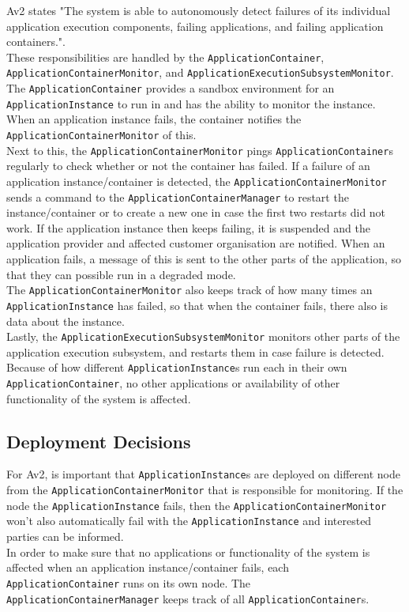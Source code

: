         Av2 states "The system is able to autonomously detect failures of its individual
        application execution components, failing applications, and failing application containers.".\\
        These responsibilities are handled by the \texttt{ApplicationContainer}, \texttt{ApplicationContainerMonitor}, and \texttt{ApplicationExecutionSubsystemMonitor}.
        The \texttt{ApplicationContainer} provides a sandbox environment for an \texttt{ApplicationInstance} to run in and has the ability
        to monitor the instance. When an application instance fails, the container notifies the \texttt{ApplicationContainerMonitor} of this.\\
        Next to this, the \texttt{ApplicationContainerMonitor} pings \texttt{ApplicationContainer}s regularly to check whether or not the container
        has failed. If a failure of an application instance/container is detected, the \texttt{ApplicationContainerMonitor} sends a command to the
        \texttt{ApplicationContainerManager} to restart the instance/container or to create a new one in case the first two restarts did not work.
        If the application instance then keeps failing, it is suspended and the application provider and affected customer organisation are notified.
        When an application fails, a message of this is sent to the other parts of the application, so that they can possible run in a degraded mode. \\
        The \texttt{ApplicationContainerMonitor} also keeps track of how many times an \texttt{ApplicationInstance} has failed, so that when the container
        fails, there also is data about the instance.\\
        Lastly, the \texttt{ApplicationExecutionSubsystemMonitor} monitors other parts of the application execution subsystem, and restarts them
        in case failure is detected. \\

        Because of how different \texttt{ApplicationInstance}s run each in their own \texttt{ApplicationContainer}, no other applications or availability
        of other functionality of the system is affected.

    \subsection*{Deployment Decisions}
        For Av2, is important that \texttt{ApplicationInstance}s are deployed on different node from the \texttt{ApplicationContainerMonitor} that is responsible for
        monitoring. If the node the \texttt{ApplicationInstance} fails, then the \texttt{ApplicationContainerMonitor} won't also automatically fail with the \texttt{ApplicationInstance}
        and interested parties can be informed. \\
        In order to make sure that no applications or functionality of the system is affected when an application instance/container fails, each \texttt{ApplicationContainer}
        runs on its own node. The \texttt{ApplicationContainerManager} keeps track of all \texttt{ApplicationContainer}s.
